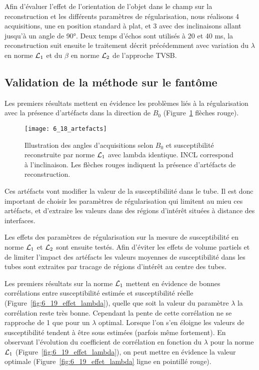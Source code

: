 {Afin d’évaluer l’effet de l’orientation de l’objet dans le champ sur la reconstruction et les
différents paramètres de régularisation, nous réalisons 4 acquisitions, une en position standard à plat,
et 3 avec des inclinaisons allant jusqu’à un angle de 90°. Deux temps d’échos sont utilisés à 20 et 40
ms, la reconstruction suit ensuite le traitement décrit précédemment avec variation du $\lambda$ en norme ${\cal L}_1$
et du $\beta$ en norme ${\cal L}_2$ de l’approche TVSB.

\subsection{Validation de la méthode sur le fantôme}
Les premiers résultats mettent en évidence les problèmes liés à la régularisation avec la
présence d’artéfacts dans la direction de $B_0$ (Figure~\ref{fig:6_18_artefacts} flèches rouge). 
\begin{figure}[!t]
\centering
\texttt{[image: 6\_18\_artefacts]}
\caption{Illustration des angles d'acquisitions selon $B_0$ et susceptibilité reconstruite par norme ${\cal L}_1$ avec lambda
identique. INCL correspond à l’inclinaison. Les flèches rouges indiquent la présence d’artéfacts de reconstruction.}
\label{fig:6_18_artefacts}	
\end{figure}
Ces artéfacts vont modifier la
valeur de la susceptibiliité dans le tube. Il est donc important de choisir les paramètres de
régularisation qui limitent au mieu ces artéfacts, et d’extraire les valeurs dans des régions d’intérêt
situées à distance des interfaces.

Les effets des paramètres de régularisation sur la mesure de susceptibilité en norme ${\cal L}_1$ et ${\cal L}_2$ sont
ensuite testés. Afin d’éviter les effets de volume partiels et de limiter l’impact des artéfacts les valeurs
moyennes de susceptibilité dans les tubes sont extraites par tracage de régions d’intérêt au centre des
tubes.

Les premiers résultats sur la norme ${\cal L}_1$ mettent en évidence de bonnes corrélations entre
susceptibilité estimée et susceptibilité réelle (Figure~\ref{fig:6_19_effet_lambda}), quelle que soit la valeur du paramètre $\lambda$ la
corrélation reste très bonne. Cependant la pente de cette corrélation ne se rapproche de 1 que pour
un $\lambda$ optimal. Lorsque l’on s’en éloigne les valeurs de susceptibilité tendent à être sous estimées
(parfois même fortement). En observant l’évolution du coefficient de corrélation en fonction du $\lambda$ pour
la norme ${\cal L}_1$ (Figure~\ref{fig:6_19_effet_lambda}), on peut mettre en évidence la valeur optimale (Figure~\ref{fig:6_19_effet_lambda} ligne en pointillé
rouge). 

}
